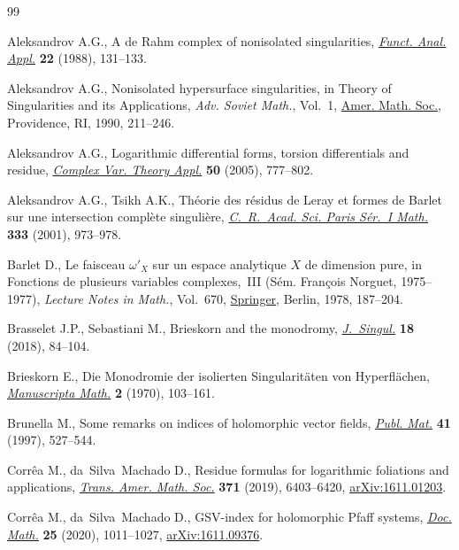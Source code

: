 \begin{thebibliography}{99}
\footnotesize\itemsep=0pt

Aleksandrov A.G., A de {R}ahm complex of nonisolated singularities,
 \href{https://doi.org/10.1007/BF01077604}{\textit{Funct. Anal. Appl.}} \textbf{22} (1988), 131--133.

Aleksandrov A.G., Nonisolated hypersurface singularities, in Theory of
 Singularities and its Applications, \textit{Adv. Soviet Math.}, Vol.~1, \href{https://doi.org/10.1070/sm1990v065n02abeh001164}{Amer.
 Math. Soc.}, Providence, RI, 1990, 211--246.

Aleksandrov A.G., Logarithmic differential forms, torsion differentials and
 residue, \href{https://doi.org/10.1080/02781070500128313}{\textit{Complex Var. Theory Appl.}} \textbf{50} (2005), 777--802.

Aleksandrov A.G., Tsikh A.K., Th\'eorie des r\'esidus de {L}eray et formes de
 {B}arlet sur une intersection compl\`ete singuli\`ere, \href{https://doi.org/10.1016/S0764-4442(01)02166-8}{\textit{C.~R.~Acad.
 Sci. Paris S\'er.~I Math.}} \textbf{333} (2001), 973--978.

Barlet D., Le faisceau {$\omega'_{X}$} sur un espace analytique {$X$} de
 dimension pure, in Fonctions de plusieurs variables complexes,~{III}
 ({S}\'em. {F}rançois {N}orguet, 1975--1977), \textit{Lecture Notes in
 Math.}, Vol.~670, \href{https://doi.org/10.1007/BFb0064400}{Springer}, Berlin, 1978, 187--204.

Brasselet J.P., Sebastiani M., Brieskorn and the monodromy, \href{https://doi.org/10.5427/jsing.2018.18f}{\textit{J.~Singul.}}
 \textbf{18} (2018), 84--104.

Brieskorn E., Die {M}onodromie der isolierten {S}ingularit\"aten von
 {H}yperfl\"achen, \href{https://doi.org/10.1007/BF01155695}{\textit{Manuscripta Math.}} \textbf{2} (1970), 103--161.

Brunella M., Some remarks on indices of holomorphic vector fields,
 \href{https://doi.org/10.5565/PUBLMAT_41297_17}{\textit{Publ. Mat.}} \textbf{41} (1997), 527--544.

Corr\^ea M., da~Silva~Machado D., Residue formulas for logarithmic foliations
 and applications, \href{https://doi.org/10.1090/tran/7584}{\textit{Trans. Amer. Math. Soc.}} \textbf{371} (2019),
 6403--6420, \href{https://arxiv.org/abs/1611.01203}{arXiv:1611.01203}.

Corr\^ea M., da~Silva~Machado D., G{SV}-index for holomorphic {P}faff systems,
 \href{https://doi.org/10.25537/dm.2020v25.1011-1027}{\textit{Doc. Math.}} \textbf{25} (2020), 1011--1027, \href{https://arxiv.org/abs/1611.09376}{arXiv:1611.09376}.


\end{thebibliography}
